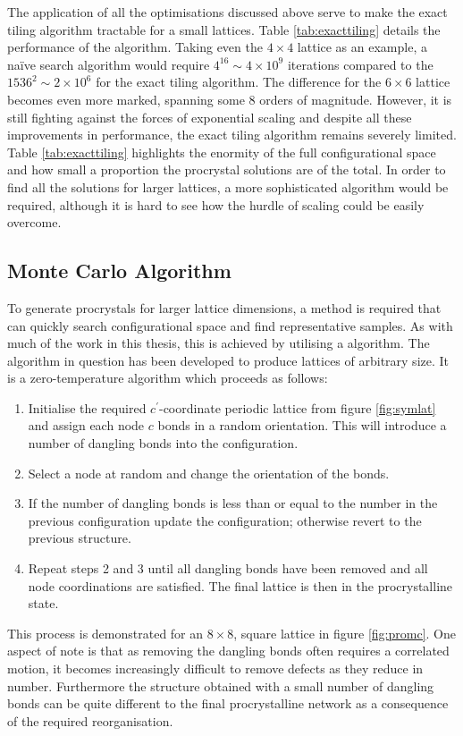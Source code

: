 The application of all the optimisations discussed above serve to make the exact tiling algorithm tractable for a small lattices.
Table \ref{tab:exacttiling} details the performance of the algorithm.
Taking even the $4\times 4$ lattice as an example, a na\"ive search algorithm would require $4^{16}\sim 4\times10^9$ iterations compared to the $1536^2\sim 2\times10^6$ for the exact tiling algorithm.
The difference for the $6\times 6$ lattice becomes even more marked, spanning some 8 orders of magnitude.
However, it is still fighting against the forces of exponential scaling and despite all these improvements in performance, the exact tiling algorithm remains severely limited. 
Table \ref{tab:exacttiling} highlights the enormity of the full configurational space and how small a proportion the procrystal solutions are of the total.
In order to find all the solutions for larger lattices, a more sophisticated algorithm would be required, although it is hard to see how the hurdle of scaling could be easily overcome.

\subsection{Monte Carlo Algorithm}
\label{s:promc}

To generate procrystals for larger lattice dimensions, a method is required that can quickly search configurational space and find representative samples.
As with much of the work in this thesis, this is achieved by utilising a \mc{} algorithm.
The algorithm in question has been developed to produce lattices of arbitrary size.
It is a zero\--temperature \mc{} algorithm which proceeds as follows:
\begin{enumerate}
	\item Initialise the required $c^\prime$\--coordinate periodic lattice from figure \ref{fig:symlat} and assign each node $c$ bonds in a random orientation. This will introduce a number of dangling bonds into the configuration.
	\item Select a node at random and change the orientation of the bonds.
	\item If the number of dangling bonds is less than or equal to the number in the previous configuration update the configuration; otherwise revert to the previous structure.
	\item Repeat steps 2 and 3 until all dangling bonds have been removed and all node coordinations are satisfied.
	The final lattice is then in the procrystalline state.
\end{enumerate}
This process is demonstrated for an $8\times 8$, square lattice in figure \ref{fig:promc}.
One aspect of note is that as removing the dangling bonds often requires a correlated motion, it becomes increasingly difficult to remove defects as they reduce in number.
Furthermore the structure obtained with a small number of dangling bonds can be quite different to the final procrystalline network as a consequence of the required reorganisation.

